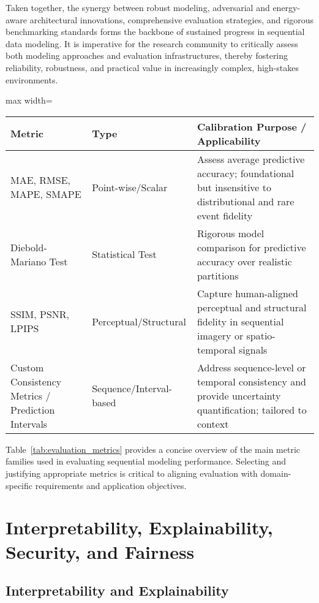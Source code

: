 \documentclass[sigconf]{acmart}
\begin{document}
Taken together, the synergy between robust modeling, adversarial and energy-aware architectural innovations, comprehensive evaluation strategies, and rigorous benchmarking standards forms the backbone of sustained progress in sequential data modeling. It is imperative for the research community to critically assess both modeling approaches and evaluation infrastructures, thereby fostering reliability, robustness, and practical value in increasingly complex, high-stakes environments.

\begin{table*}[htbp]
\centering
\caption{Overview of Key Evaluation Metrics for Sequential Data Modeling}
\label{tab:evaluation_metrics}
\begin{adjustbox}{max width=\textwidth}
\begin{tabular}{lll}
\toprule
\textbf{Metric} & \textbf{Type} & \textbf{Calibration Purpose / Applicability} \\
\midrule
MAE, RMSE, MAPE, SMAPE & Point-wise/Scalar & Assess average predictive accuracy; foundational but insensitive to distributional and rare event fidelity \\
Diebold-Mariano Test & Statistical Test & Rigorous model comparison for predictive accuracy over realistic partitions \\
SSIM, PSNR, LPIPS & Perceptual/Structural & Capture human-aligned perceptual and structural fidelity in sequential imagery or spatio-temporal signals \\
Custom Consistency Metrics / Prediction Intervals & Sequence/Interval-based & Address sequence-level or temporal consistency and provide uncertainty quantification; tailored to context \\
\bottomrule
\end{tabular}
\end{adjustbox}
\end{table*}

Table~\ref{tab:evaluation_metrics} provides a concise overview of the main metric families used in evaluating sequential modeling performance. Selecting and justifying appropriate metrics is critical to aligning evaluation with domain-specific requirements and application objectives.

\section{Interpretability, Explainability, Security, and Fairness}

\subsection{Interpretability and Explainability}
\end{document}

